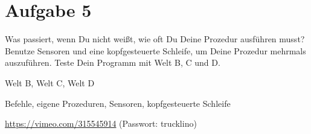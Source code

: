 \section*{Aufgabe 5}
\label{sec:exercises:5}

Was passiert, wenn Du nicht weißt, wie oft Du Deine Prozedur ausführen musst? Benutze Sensoren und eine kopfgesteuerte Schleife, um Deine Prozedur mehrmals auszuführen. Teste Dein Programm mit Welt B, C und D.

\begin{description}[noitemsep]
  \item[Welt wählen:] Welt B, Welt C, Welt D
  \item[Du brauchst:] Befehle, eigene Prozeduren, Sensoren, kopfgesteuerte Schleife
  \item[Video:] \url{https://vimeo.com/315545914} (Passwort: trucklino)
\end{description}

